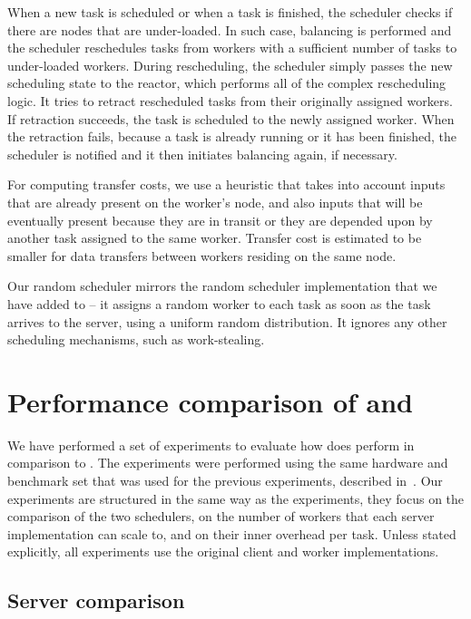 When a new task is scheduled or when a task is finished, the scheduler checks if there are nodes
that are under-loaded. In such case, balancing is performed and the scheduler reschedules tasks
from workers with a sufficient number of tasks to under-loaded workers. During rescheduling, the
scheduler simply passes the new scheduling state to the reactor, which performs all of the complex
rescheduling logic. It tries to retract rescheduled tasks from their originally assigned workers.
If retraction succeeds, the task is scheduled to the newly assigned worker. When the retraction
fails, because a task is already running or it has been finished, the scheduler is notified and it
then initiates balancing again, if necessary.

For computing transfer costs, we use a heuristic that takes into account inputs that are already
present on the worker's node, and also inputs that will be eventually present because they are in
transit or they are depended upon by another task assigned to the same worker. Transfer cost is
estimated to be smaller for data transfers between workers residing on the same node.

Our random scheduler mirrors the random scheduler implementation that we have added to
\dask{} -- it assigns a random worker to each task as soon as the task arrives
to the server, using a uniform random distribution. It ignores any other scheduling mechanisms,
such as work-stealing.

\section{Performance comparison of \dask{} and \rsds{}}
\label{sec:rsds-dask-comparison}
We have performed a set of experiments to evaluate how does \rsds{} perform in
comparison to \dask{}. The experiments were performed using the same hardware
and benchmark set that was used for the previous \dask{} experiments, described
in~. Our experiments are structured in the same way as the
\dask{} experiments, they focus on the comparison of the two schedulers, on the
number of workers that each server implementation can scale to, and on their inner overhead per
task. Unless stated explicitly, all experiments use the original \dask{} client
and worker implementations.

\subsection*{Server comparison}

